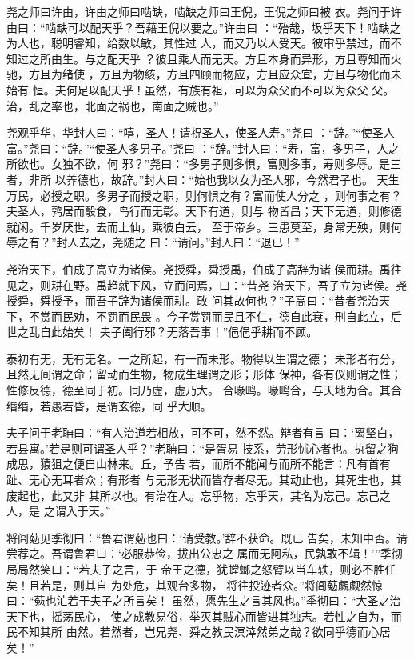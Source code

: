 \documentclass[12pt,UTF8]{ctexbook}
\begin{document}
尧之师曰许由，许由之师曰啮缺，啮缺之师曰王倪，王倪之师曰被 衣。尧问于许由曰：“啮缺可以配天乎？吾藉王倪以要之。”许由曰 ：“殆哉，圾乎天下！啮缺之为人也，聪明睿知，给数以敏，其性过 人，而又乃以人受天。彼审乎禁过，而不知过之所由生。与之配天乎 ？彼且乘人而无天。方且本身而异形，方且尊知而火驰，方且为绪使 ，方且为物絯，方且四顾而物应，方且应众宜，方且与物化而未始有 恒。夫何足以配天乎！虽然，有族有祖，可以为众父而不可以为众父 父。治，乱之率也，北面之祸也，南面之贼也。”

尧观乎华，华封人曰：“嘻，圣人！请祝圣人，使圣人寿。”尧曰 ：“辞。”“使圣人富。”尧曰：“辞。”“使圣人多男子。”尧曰 ：“辞。”封人曰：“寿，富，多男子，人之所欲也。女独不欲，何 邪？”尧曰：“多男子则多惧，富则多事，寿则多辱。是三者，非所 以养德也，故辞。”封人曰：“始也我以女为圣人邪，今然君子也。 天生万民，必授之职。多男子而授之职，则何惧之有？富而使人分之 ，则何事之有？夫圣人，鹑居而彀食，鸟行而无彰。天下有道，则与 物皆昌；天下无道，则修德就闲。千岁厌世，去而上仙，乘彼白云， 至于帝乡。三患莫至，身常无殃，则何辱之有？”封人去之，尧随之 曰：“请问。”封人曰：“退已！”

尧治天下，伯成子高立为诸侯。尧授舜，舜授禹，伯成子高辞为诸 侯而耕。禹往见之，则耕在野。禹趋就下风，立而问焉，曰：“昔尧 治天下，吾子立为诸侯。尧授舜，舜授予，而吾子辞为诸侯而耕。敢 问其故何也？”子高曰：“昔者尧治天下，不赏而民劝，不罚而民畏 。今子赏罚而民且不仁，德自此衰，刑自此立，后世之乱自此始矣！ 夫子阖行邪？无落吾事！”俋俋乎耕而不顾。

泰初有无，无有无名。一之所起，有一而未形。物得以生谓之德； 未形者有分，且然无间谓之命；留动而生物，物成生理谓之形；形体 保神，各有仪则谓之性；性修反德，德至同于初。同乃虚，虚乃大。 合喙鸣。喙鸣合，与天地为合。其合缗缗，若愚若昏，是谓玄德，同 乎大顺。

夫子问于老聃曰：“有人治道若相放，可不可，然不然。辩者有言 曰：‘离坚白，若县寓。’若是则可谓圣人乎？”老聃曰：“是胥易 技系，劳形怵心者也。执留之狗成思，猿狙之便自山林来。丘，予告 若，而所不能闻与而所不能言：凡有首有趾、无心无耳者众；有形者 与无形无状而皆存者尽无。其动止也，其死生也，其废起也，此又非 其所以也。有治在人。忘乎物，忘乎天，其名为忘己。忘己之人，是 之谓入于天。”

将闾葂见季彻曰：“鲁君谓葂也曰：‘请受教。’辞不获命。既已 告矣，未知中否。请尝荐之。吾谓鲁君曰：‘必服恭俭，拔出公忠之 属而无阿私，民孰敢不辑！’”季彻局局然笑曰：“若夫子之言，于 帝王之德，犹螳螂之怒臂以当车轶，则必不胜任矣！且若是，则其自 为处危，其观台多物， 将往投迹者众。”将闾葂覷觑然惊曰：“葂也汒若于夫子之所言矣！ 虽然，愿先生之言其风也。”季彻曰：“大圣之治天下也，摇荡民心， 使之成教易俗，举灭其贼心而皆进其独志。若性之自为，而民不知其所 由然。若然者，岂兄尧、舜之教民溟涬然弟之哉？欲同乎德而心居矣！”
\end{document}
